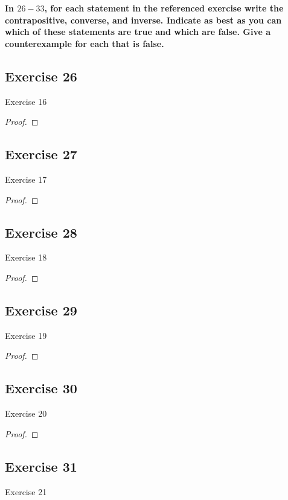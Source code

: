 \documentclass[14pt]{extarticle}
\begin{document}
{\bf \color{cyan} In $26-33$, for each statement in the referenced exercise write the contrapositive, converse, and inverse. Indicate as best as you can which of these statements are true and which are false. Give a counterexample for each that is false.}

\subsection{Exercise 26}
Exercise 16 

\begin{proof}

\end{proof}

\subsection{Exercise 27}
Exercise 17

\begin{proof}

\end{proof}

\subsection{Exercise 28}
Exercise 18

\begin{proof}

\end{proof}

\subsection{Exercise 29}
Exercise 19

\begin{proof}

\end{proof}

\subsection{Exercise 30}
Exercise 20

\begin{proof}

\end{proof}

\subsection{Exercise 31}
Exercise 21
\end{document}
